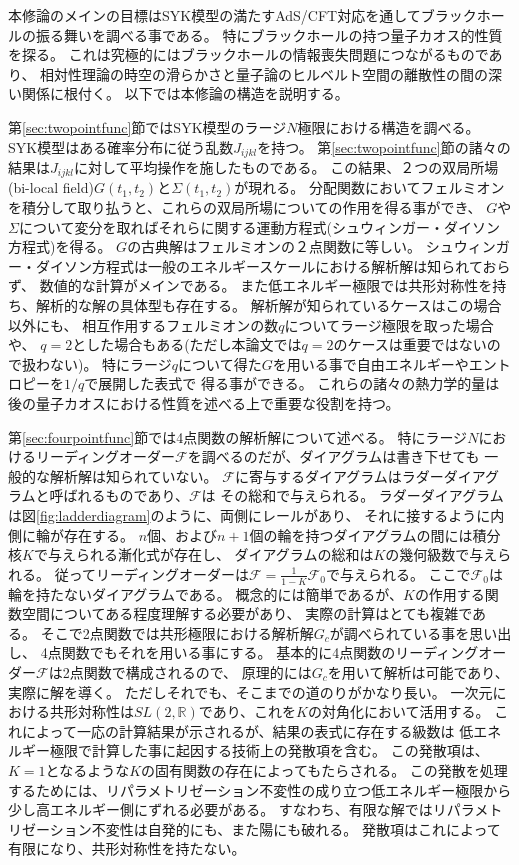 本修論のメインの目標はSYK模型の満たすAdS/CFT対応を通してブラックホールの振る舞いを調べる事である。
特にブラックホールの持つ量子カオス的性質を探る。
これは究極的にはブラックホールの情報喪失問題につながるものであり、
相対性理論の時空の滑らかさと量子論のヒルベルト空間の離散性の間の深い関係に根付く\cite{stanford_chaos}。
以下では本修論の構造を説明する。

第\ref{sec:twopointfunc}節ではSYK模型のラージ$N$極限における構造を調べる。
SYK模型はある確率分布に従う乱数$J_{ijkl}$を持つ。
第\ref{sec:twopointfunc}節の諸々の結果は$J_{ijkl}$に対して平均操作を施したものである。
この結果、２つの双局所場(bi-local field)$G(t_1, t_2)$と$\Sigma(t_1, t_2)$が現れる。
分配関数においてフェルミオンを積分して取り払うと、これらの双局所場についての作用を得る事ができ、
$G$や$\Sigma$について変分を取ればそれらに関する運動方程式(シュウィンガー・ダイソン方程式)を得る。
$G$の古典解はフェルミオンの２点関数に等しい。
シュウィンガー・ダイソン方程式は一般のエネルギースケールにおける解析解は知られておらず、
数値的な計算がメインである。
また低エネルギー極限では共形対称性を持ち、解析的な解の具体型も存在する。
解析解が知られているケースはこの場合以外にも、
相互作用するフェルミオンの数$q$についてラージ極限を取った場合や、
$q=2$とした場合もある(ただし本論文では$q=2$のケースは重要ではないので扱わない)。
特にラージ$q$について得た$G$を用いる事で自由エネルギーやエントロピーを$1/q$で展開した表式で
得る事ができる。
これらの諸々の熱力学的量は後の量子カオスにおける性質を述べる上で重要な役割を持つ。

第\ref{sec:fourpointfunc}節では4点関数の解析解について述べる。
特にラージ$N$におけるリーディングオーダー$\mathcal{F}$を調べるのだが、ダイアグラムは書き下せても
一般的な解析解は知られていない。
$\mathcal{F}$に寄与するダイアグラムはラダーダイアグラムと呼ばれるものであり、$\mathcal{F}$は
その総和で与えられる。
ラダーダイアグラムは図\ref{fig:ladderdiagram}のように、両側にレールがあり、
それに接するように内側に輪が存在する。
$n$個、および$n+1$個の輪を持つダイアグラムの間には積分核$K$で与えられる漸化式が存在し、
ダイアグラムの総和は$K$の幾何級数で与えられる。
従ってリーディングオーダーは$\mathcal{F} = \frac{1}{1-K}\mathcal{F}_0$で与えられる。
ここで$\mathcal{F}_0$は輪を持たないダイアグラムである。
概念的には簡単であるが、$K$の作用する関数空間についてある程度理解する必要があり、
実際の計算はとても複雑である。
そこで2点関数では共形極限における解析解$G_c$が調べられている事を思い出し、
4点関数でもそれを用いる事にする。
基本的に4点関数のリーディングオーダー$\mathcal{F}$は2点関数で構成されるので、
原理的には$G_c$を用いて解析は可能であり、実際に解を導く。
ただしそれでも、そこまでの道のりがかなり長い。
一次元における共形対称性は$SL(2, \mathbb{R})$であり、これを$K$の対角化において活用する。
これによって一応の計算結果が示されるが、結果の表式に存在する級数は
低エネルギー極限で計算した事に起因する技術上の発散項を含む。
この発散項は、$K = 1$となるような$K$の固有関数の存在によってもたらされる。
この発散を処理するためには、リパラメトリゼーション不変性の成り立つ低エネルギー極限から
少し高エネルギー側にずれる必要がある。
すなわち、有限な解ではリパラメトリゼーション不変性は自発的にも、また陽にも破れる。
発散項はこれによって有限になり、共形対称性を持たない。

